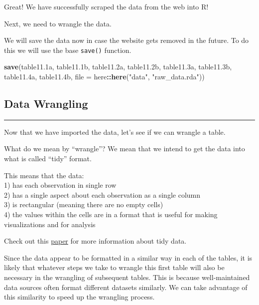 \documentclass[
]{article}
\newenvironment{Shaded}{\begin{snugshade}}{\end{snugshade}}
\newcommand{\DataTypeTok}[1]{\textcolor[rgb]{0.13,0.29,0.53}{#1}}
\newcommand{\FloatTok}[1]{\textcolor[rgb]{0.00,0.00,0.81}{#1}}
\newcommand{\KeywordTok}[1]{\textcolor[rgb]{0.13,0.29,0.53}{\textbf{#1}}}
\newcommand{\NormalTok}[1]{#1}
\newcommand{\OperatorTok}[1]{\textcolor[rgb]{0.81,0.36,0.00}{\textbf{#1}}}
\newcommand{\StringTok}[1]{\textcolor[rgb]{0.31,0.60,0.02}{#1}}
\begin{document}
Great! We have successfully scraped the data from the web into R!

Next, we need to wrangle the data.

We will save the data now in case the website gets removed in the
future. To do this we will use the base \texttt{save()} function.

\begin{Shaded}
\begin{Highlighting}[]
\KeywordTok{save}\NormalTok{(table11}\FloatTok{.1}\NormalTok{a, table11}\FloatTok{.1}\NormalTok{b, table11}\FloatTok{.2}\NormalTok{a, table11}\FloatTok{.2}\NormalTok{b, }
\NormalTok{     table11}\FloatTok{.3}\NormalTok{a, table11}\FloatTok{.3}\NormalTok{b, table11}\FloatTok{.4}\NormalTok{a, table11}\FloatTok{.4}\NormalTok{b, }\DataTypeTok{file =}\NormalTok{ here}\OperatorTok{::}\KeywordTok{here}\NormalTok{(}\StringTok{"data"}\NormalTok{, }\StringTok{"raw_data.rda"}\NormalTok{))}
\end{Highlighting}
\end{Shaded}

\hypertarget{data-wrangling}{%
\subsection{\texorpdfstring{\textbf{Data
Wrangling}}{Data Wrangling}}\label{data-wrangling}}

\begin{center}\rule{0.5\linewidth}{0.5pt}\end{center}

Now that we have imported the data, let's see if we can wrangle a table.

What do we mean by ``wrangle''? We mean that we intend to get the data
into what is called ``tidy'' format.

This means that the data:\\
1) has each observation in single row\\
2) has a single aspect about each observation as a single column\\
3) is rectangular (meaning there are no empty cells)\\
4) the values within the cells are in a format that is useful for making
visualizations and for analysis

Check out this \href{https://vita.had.co.nz/papers/tidy-data.pdf}{paper}
for more information about tidy data.

Since the data appear to be formatted in a similar way in each of the
tables, it is likely that whatever steps we take to wrangle this first
table will also be necessary in the wrangling of subsequent tables. This
is because well-maintained data sources often format different datasets
similarly. We can take advantage of this similarity to speed up the
wrangling process.
\end{document}

